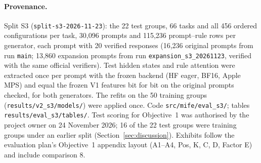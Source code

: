 \documentclass{article}
\begin{document}
\paragraph{Provenance.} Split S3 (\texttt{split-s3-2026-11-23}): the 22 test groups, 66 tasks and all 456 ordered
configurations per task, 30,096 prompts and 115,236 prompt--rule rows per generator, each prompt with 20 verified
responses (16,236 original prompts from run \texttt{main}; 13,860 expansion prompts from run
\texttt{expansion\_s3\_20261123}, verified with the same official verifiers). Test hidden states and rule attention were
extracted once per prompt with the frozen backend (HF eager, BF16, Apple MPS) and equal the frozen V1 features bit for
bit on the original prompts checked, for both generators. The refits on the 50 training groups
(\texttt{results/v2\_s3/models/}) were applied once. Code \texttt{src/mife/eval\_s3/}; tables
\texttt{results/eval\_s3/tables/}. Test scoring for Objective~1 was authorised by the project owner on 24 November 2026;
16 of the 22 test groups were training groups under an earlier split (Section~\ref{sec:discussion}). Exhibits follow
the evaluation plan's Objective~1 appendix layout (A1--A4, Pos, K, C, D, Factor E) and include comparison 8.
\end{document}
